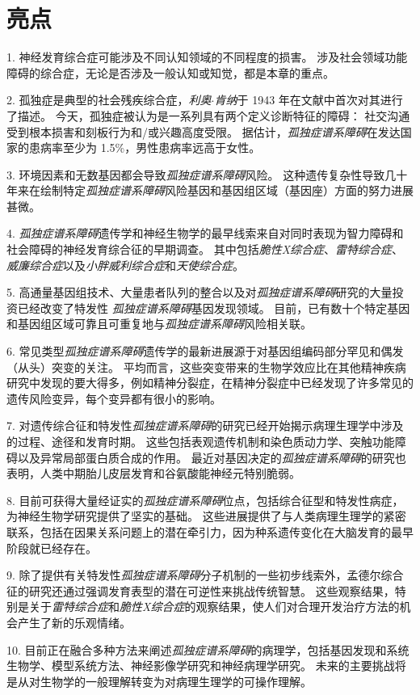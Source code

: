 \section{亮点}

1. 神经发育综合症可能涉及不同认知领域的不同程度的损害。
涉及社会领域功能障碍的综合症，无论是否涉及一般认知或知觉，都是本章的重点。


2. 孤独症是典型的社会残疾综合症，\textit{利奥$\cdot$肯纳}于 1943 年在文献中首次对其进行了描述。
今天，孤独症被认为是一系列具有两个定义诊断特征的障碍：
社交沟通受到根本损害和刻板行为和/或兴趣高度受限。
据估计，\textit{孤独症谱系障碍}在发达国家的患病率至少为 1.5\%，男性患病率远高于女性。


3. 环境因素和无数基因都会导致\textit{孤独症谱系障碍}风险。
这种遗传复杂性导致几十年来在绘制特定\textit{孤独症谱系障碍}风险基因和基因组区域（基因座）方面的努力进展甚微。


4. \textit{孤独症谱系障碍}遗传学和神经生物学的最早线索来自对同时表现为智力障碍和社会障碍的神经发育综合征的早期调查。
其中包括\textit{脆性X综合症}、\textit{雷特综合症}、\textit{威廉综合症}以及\textit{小胖威利综合症}和\textit{天使综合症}。 


5. 高通量基因组技术、大量患者队列的整合以及对\textit{孤独症谱系障碍}研究的大量投资已经改变了特发性 \textit{孤独症谱系障碍}基因发现领域。
目前，已有数十个特定基因和基因组区域可靠且可重复地与\textit{孤独症谱系障碍}风险相关联。 


6. 常见类型\textit{孤独症谱系障碍}遗传学的最新进展源于对基因组编码部分罕见和偶发（从头）突变的关注。
平均而言，这些突变带来的生物学效应比在其他精神疾病研究中发现的要大得多，例如精神分裂症，在精神分裂症中已经发现了许多常见的遗传风险变异，每个变异都有很小的影响。


7. 对遗传综合征和特发性\textit{孤独症谱系障碍}的研究已经开始揭示病理生理学中涉及的过程、途径和发育时期。
这些包括表观遗传机制和染色质动力学、突触功能障碍以及异常局部蛋白质合成的作用。
最近对基因决定的\textit{孤独症谱系障碍}的研究也表明，人类中期胎儿皮层发育和谷氨酸能神经元特别脆弱。


8. 目前可获得大量经证实的\textit{孤独症谱系障碍}位点，包括综合征型和特发性病症，为神经生物学研究提供了坚实的基础。
这些进展提供了与人类病理生理学的紧密联系，包括在因果关系问题上的潜在牵引力，因为种系遗传变化在大脑发育的最早阶段就已经存在。


9. 除了提供有关特发性\textit{孤独症谱系障碍}分子机制的一些初步线索外，孟德尔综合征的研究还通过强调发育表型的潜在可逆性来挑战传统智慧。
这些观察结果，特别是关于\textit{雷特综合症}和\textit{脆性X综合症}的观察结果，使人们对合理开发治疗方法的机会产生了新的乐观情绪。


10. 目前正在融合多种方法来阐述\textit{孤独症谱系障碍}的病理学，包括基因发现和系统生物学、模型系统方法、神经影像学研究和神经病理学研究。
未来的主要挑战将是从对生物学的一般理解转变为对病理生理学的可操作理解。

